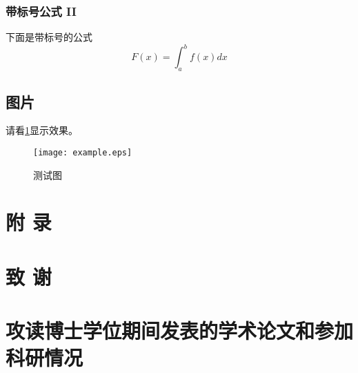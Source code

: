 \documentclass{nwpu}
\begin{document}
            \subsection{带标号公式 II}
                下面是带标号的公式
                \begin{equation}
                    F(x) = \int_a^b f(x) dx
                \end{equation}

        \section{图片}
            请看\ref{figOne}显示效果。
            \begin{figure}
              \centering
              \texttt{[image: example.eps]}\\  %
              \caption{测试图}\label{figOne}
            \end{figure}



    \backmatter


    \chapter{附 \quad 录}


    \chapter{致 \quad 谢}

    \chapter{攻读博士学位期间发表的学术论文和参加科研情况}

    \statement  %
\end{document}
